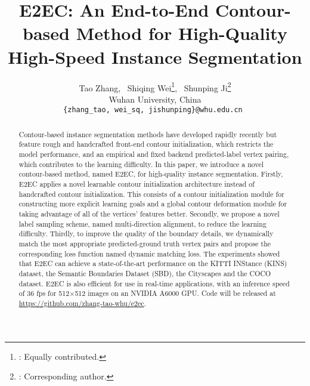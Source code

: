 \documentclass[10pt,twocolumn,letterpaper]{article}
\begin{document}
\title{E2EC: An End-to-End Contour-based Method for High-Quality High-Speed Instance Segmentation}

\author{
{
Tao Zhang, ~Shiqing Wei\thanks{ : Equally contributed.}, ~Shunping Ji\thanks{ : Corresponding author.}}\\
{
Wuhan University, China}\\
\small \tt \{zhang\_tao,  wei\_sq, jishunping\}@whu.edu.cn 
}
\maketitle

\begin{abstract}
Contour-based instance segmentation methods have developed rapidly recently but feature rough and handcrafted front-end contour initialization, which restricts the model performance, and an empirical and fixed backend predicted-label vertex pairing, which contributes to the learning difficulty. In this paper, we introduce a novel contour-based method, named E2EC, for high-quality instance segmentation. Firstly, E2EC applies a novel learnable contour initialization architecture instead of handcrafted contour initialization. This consists of a contour initialization module for constructing more explicit learning goals and a global contour deformation module for taking advantage of all of the vertices' features better. Secondly, we propose a novel label sampling scheme, named multi-direction alignment, to reduce the learning difficulty. Thirdly, to improve the quality of the boundary details, we dynamically match the most appropriate predicted-ground truth vertex pairs and propose the corresponding loss function named dynamic matching loss. The experiments showed that E2EC can achieve a state-of-the-art performance on the KITTI INStance (KINS) dataset, the Semantic Boundaries Dataset (SBD), the Cityscapes and the COCO dataset. E2EC is also efficient for use in real-time applications, with an inference speed of 36 fps for 512×512 images on an NVIDIA A6000 GPU. Code will be released at \href{https://github.com/zhang-tao-whu/e2ec}{https://github.com/zhang-tao-whu/e2ec}.
\end{abstract}\vspace{-5mm}
\end{document}
